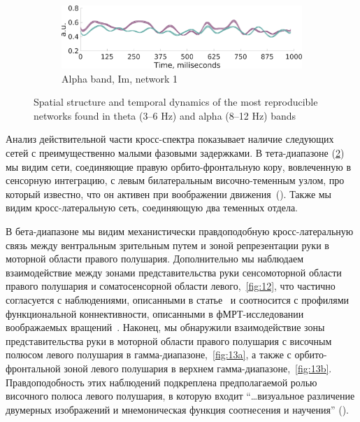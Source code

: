 \begin{figure}
\begin{subfigure}[b]{0.4\textwidth}
 \includegraphics[width=\textwidth]{../images/psiicos_paper/Figure11_b2.jpg}
 \caption{Alpha band, Im, network 1}\label{fig:11b}
 \end{subfigure}
 \caption{Spatial structure and temporal dynamics of the most reproducible networks found in theta (3--6 Hz) and alpha (8--12 Hz) bands}\label{fig:11}
\end{figure} %

Анализ действительной части кросс-спектра показывает наличие следующих сетей с преимущественно
малыми фазовыми задержками. В тета-диапазоне (\ref{fig:11}) мы видим сети,
соединяющие правую орбито-фронтальную кору, вовлеченную в сенсорную интеграцию, с левым
билатеральным височно-теменным узлом, про который известно, что он активен при воображении
движения~(\cite{Hanakawa2008}). Также мы видим кросс-латеральную сеть, соединяющую два
теменных отдела.

В бета-диапазоне мы видим механистически правдоподобную кросс-латеральную связь
между вентральным зрительным путем и зоной репрезентации руки в моторной
области правого полушария. Дополнительно мы наблюдаем взаимодействие между
зонами представительства руки сенсомоторной области правого полушария и
соматосенсорной области левого,~\ref{fig:12}, что частично
согласуется с наблюдениями, описанными в статье~\cite{Lamm2007} и соотносится
с профилями функциональной коннективности, описанными в  фМРТ-исследовании
воображаемых вращений~\cite{Striem-Amit2017}. Наконец, мы обнаружили взаимодействие
зоны представительства руки в моторной области правого полушария с височным полюсом
левого полушария в гамма-диапазоне,~\ref{fig:13a}, а также с
орбито-фронтальной зоной левого полушария в верхнем гамма-диапазоне,~\ref{fig:13b}.
Правдоподобность этих наблюдений подкреплена предполагаемой
ролью височного полюса левого полушария, в которую входит ``\ldots визуальное различение
двумерных изображений и мнемоническая функция соотнесения и научения'' (\cite{Dupont2002}).

